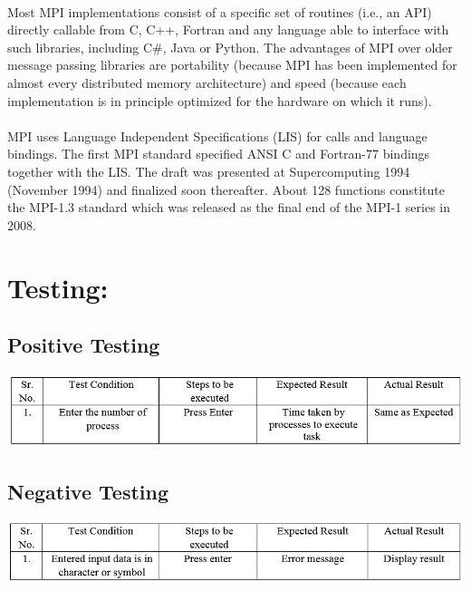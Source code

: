 \documentclass[a4paper,12pt]{article}
\begin{document}
\paragraph{} Most MPI implementations consist of a specific set of routines (i.e., an API) directly callable from C, C++, Fortran and any language able to interface with such libraries, including C\#, Java or Python. The advantages of MPI over older message passing libraries are portability (because MPI has been implemented for almost every distributed memory architecture) and speed (because each implementation is in principle optimized for the hardware on which it runs). 
\paragraph{} MPI uses Language Independent Specifications (LIS) for calls and language bindings. The first MPI standard specified ANSI C and Fortran-77 bindings together with the LIS. The draft was presented at Supercomputing 1994 (November 1994) and finalized soon thereafter. About 128 functions constitute the MPI-1.3 standard which was released as the final end of the MPI-1 series in 2008. 

\section{Testing:}
\subsection{Positive Testing}
\includegraphics[width = \textwidth]{clustertime_positive}
\subsection{Negative Testing}
\includegraphics[width = \textwidth]{clustertime_negative}
\end{document}
